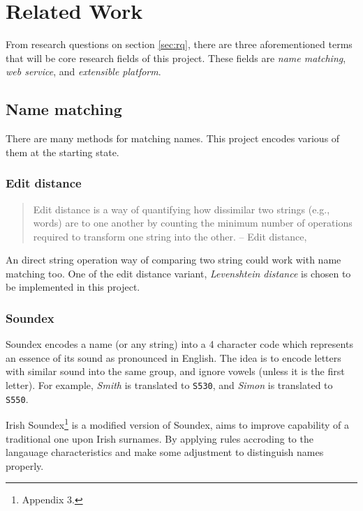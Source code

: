 \chapter{Related Work}
\label{ch:relatedwork}

From research questions on section \ref{sec:rq}, there are three aforementioned
terms that will be core research fields of this project.
These fields are \emph{name matching}, \emph{web service},
and \emph{extensible platform}.

\section{Name matching}

There are many methods for matching names. This project encodes
various of them at the starting state.

\subsection{Edit distance}

\begin{quotation} \noindent
Edit distance is a way of quantifying how dissimilar two strings
(e.g., words) are to one another by counting the minimum number
of operations required to transform one string into the other.
-- Edit distance, \citet{editdistance}
\end{quotation}

\noindent An direct string operation way of comparing two string
could work with name matching too. One of the edit distance variant,
\emph{Levenshtein distance} \citep{levenshteindistance}
is chosen to be implemented in this project.

\subsection{Soundex}

Soundex \cite{soundex} encodes a name (or any string) into a 4 character code
which represents an essence of its sound as pronounced in English.
The idea is to encode letters with similar sound into the same group,
and ignore vowels (unless it is the first letter).
For example, \emph{Smith} is translated to \texttt{S530}, and
\emph{Simon} is translated to \texttt{S550}.

Irish Soundex\footnote{\cite{adamw} Appendix 3.}
is a modified version of Soundex,
aims to improve capability of a traditional one upon Irish surnames.
By applying rules accroding to the langauage characteristics and
make some adjustment to distinguish names properly.


